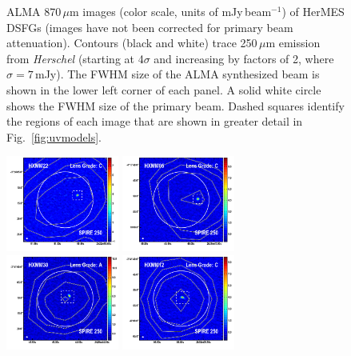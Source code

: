 \documentclass[iop]{emulateapj}
\begin{document}
\begin{figure}[!tbp]
\caption{ ALMA 870$\,\mu$m images (color scale, units of mJy$\,$beam$^{-1}$) of
HerMES DSFGs (images have not been corrected for primary beam attenuation).
Contours (black and white) trace 250$\,\mu$m emission from {\it Herschel}
(starting at 4$\sigma$ and increasing by factors of 2, where $\sigma=7\,$mJy).
The FWHM size of the ALMA synthesized beam is shown in the lower left corner of
each panel.  A solid white circle shows the FWHM size of the primary beam.
Dashed squares identify the regions of each image that are shown in greater
detail in Fig.~\ref{fig:uvmodels}.  \label{fig:imaging}}
\addtocounter{figure}{-1}

\end{figure}

\begin{figure}[!tbp] 
    \begin{centering}
\includegraphics[width=0.331\textwidth]{../Figures/overlays/HXMM22_870_250.pdf}
\includegraphics[width=0.331\textwidth]{../Figures/overlays/HXMM05_870_250.pdf}
\includegraphics[width=0.331\textwidth]{../Figures/overlays/HXMM30_870_250.pdf}
\includegraphics[width=0.331\textwidth]{../Figures/overlays/HXMM12_870_250.pdf}

\end{centering}
\end{figure}
\end{document}
